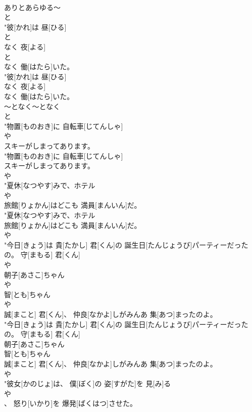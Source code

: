 \documentclass[8pt]{extreport}
\begin{document}
\begin{CJK}{UTF8}{min}
\\	ありとあらゆる～	
\\	と
\\	"彼[かれ]は 昼[ひる]
\\	と
\\	なく 夜[よる]
\\	と
\\	なく 働[はたら]いた。
\\	"彼[かれ]は 昼[ひる]
\\	なく 夜[よる]
\\	なく 働[はたら]いた。
\\	～となく～となく	
\\	と
\\	"物置[ものおき]に 自転車[じてんしゃ]
\\	や
\\	スキーがしまってあります。
\\	"物置[ものおき]に 自転車[じてんしゃ]
\\	スキーがしまってあります。
\\	や
\\	"夏休[なつやす]みで、ホテル
\\	や
\\	旅館[りょかん]はどこも 満員[まんいん]だ。
\\	"夏休[なつやす]みで、ホテル
\\	旅館[りょかん]はどこも 満員[まんいん]だ。
\\	や
\\	"今日[きょう]は 貴[たかし] 君[くん]の 誕生日[たんじょうび]パーティーだったの。 守[まもる] 君[くん]
\\	や
\\	朝子[あさこ]ちゃん
\\	や
\\	智[とも]ちゃん
\\	や
\\	誠[まこと] 君[くん]、 仲良[なかよ]しがみんあ 集[あつ]まったのよ。
\\	"今日[きょう]は 貴[たかし] 君[くん]の 誕生日[たんじょうび]パーティーだったの。 守[まもる] 君[くん]
\\	朝子[あさこ]ちゃん
\\	智[とも]ちゃん
\\	誠[まこと] 君[くん]、 仲良[なかよ]しがみんあ 集[あつ]まったのよ。
\\	や
\\	"彼女[かのじょ]は、 僕[ぼく]の 姿[すがた]を 見[み]る
\\	や
\\	、 怒り[いかり]を 爆発[ばくはつ]させた。

\end{CJK}
\end{document}

